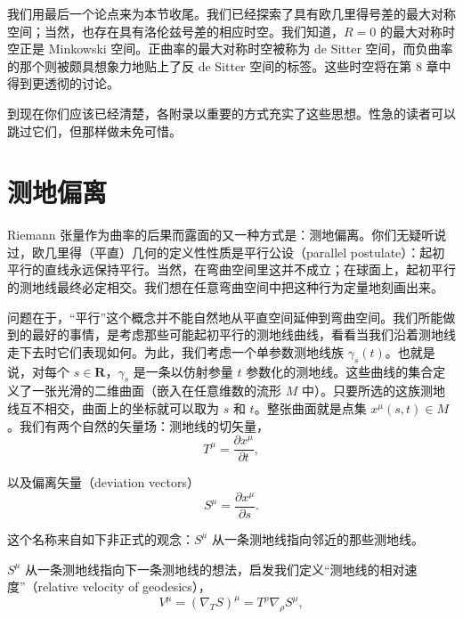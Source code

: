 我们用最后一个论点来为本节收尾。我们已经探索了具有欧几里得号差的最大对称空间；当然，也存在具有洛伦兹号差的相应时空。我们知道，$R = 0$ 的最大对称时空正是 Minkowski 空间。正曲率的最大对称时空被称为 de Sitter 空间，而负曲率的那个则被颇具想象力地贴上了反 de Sitter 空间的标签。这些时空将在第 8 章中得到更透彻的讨论。

到现在你们应该已经清楚，各附录以重要的方式充实了这些思想。性急的读者可以跳过它们，但那样做未免可惜。

\section{测地偏离}

Riemann 张量作为曲率的后果而露面的又一种方式是：测地偏离。你们无疑听说过，欧几里得（平直）几何的定义性性质是平行公设（parallel postulate）：起初平行的直线永远保持平行。当然，在弯曲空间里这并不成立；在球面上，起初平行的测地线最终必定相交。我们想在任意弯曲空间中把这种行为定量地刻画出来。

问题在于，“平行”这个概念并不能自然地从平直空间延伸到弯曲空间。我们所能做到的最好的事情，是考虑那些可能起初平行的测地线曲线，看看当我们沿着测地线走下去时它们表现如何。为此，我们考虑一个单参数测地线族 $\gamma_{s}(t)$。也就是说，对每个 $s\in\mathbf{R}$，$\gamma_{s}$ 是一条以仿射参量 $t$ 参数化的测地线。这些曲线的集合定义了一张光滑的二维曲面（嵌入在任意维数的流形 $M$ 中）。只要所选的这族测地线互不相交，曲面上的坐标就可以取为 $s$ 和 $t$。整张曲面就是点集 $x^{\mu}(s,t)\in M$。我们有两个自然的矢量场：测地线的切矢量，
\begin{equation*}
T^{\mu} = \frac{\partial x^{\mu}}{\partial t},
\tag{3.201}
\end{equation*}


以及偏离矢量（deviation vectors）
\begin{equation*}
S^{\mu} = \frac{\partial x^{\mu}}{\partial s}.
\tag{3.202}
\end{equation*}

这个名称来自如下非正式的观念：$S^{\mu}$ 从一条测地线指向邻近的那些测地线。

$S^{\mu}$ 从一条测地线指向下一条测地线的想法，启发我们定义“测地线的相对速度”（relative velocity of geodesics），
\begin{equation*}
V^{\mu} = (\nabla_{T}S)^{\mu} = T^{\rho}\nabla_{\rho}S^{\mu},
\tag{3.203}
\end{equation*}

